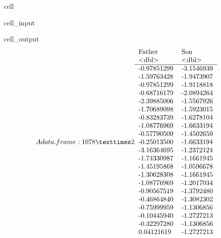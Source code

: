 \documentclass[letterpaper,10pt,english]{jupyterBook}
\begin{document}
\begin{sphinxuseclass}{cell}\begin{sphinxVerbatimInput}

\begin{sphinxuseclass}{cell_input}
\begin{sphinxVerbatim}[commandchars=\\\{\}]
\end{sphinxVerbatim}

\end{sphinxuseclass}\end{sphinxVerbatimInput}
\begin{sphinxVerbatimOutput}

\begin{sphinxuseclass}{cell_output}\begin{equation*}
\begin{split}A data.frame: 1078 × 2
\begin{tabular}{ll}
 Father & Son\\
 <dbl> & <dbl>\\
\hline
	 -0.97851299 & -3.1546939\\
	 -1.59763428 & -1.9473907\\
	 -0.97851299 & -1.9118818\\
	 -0.68716179 & -2.0894264\\
	 -2.39885006 & -1.5567926\\
	 -1.70689098 & -1.5923015\\
	 -0.83283739 & -1.6278104\\
	 -1.08776969 & -1.6633194\\
	 -0.57790509 & -1.4502659\\
	 -0.25013500 & -1.6633194\\
	 -3.16364695 & -1.2372124\\
	 -1.74330987 & -1.1661945\\
	 -1.45195868 & -1.0596678\\
	 -1.30628308 & -1.1661945\\
	 -1.08776969 & -1.2017034\\
	 -0.90567519 & -1.3792480\\
	 -0.46864840 & -1.3082302\\
	 -0.75999959 & -1.1306856\\
	 -0.10445940 & -1.2727213\\
	 -0.32297280 & -1.1306856\\
	  0.04121619 & -1.2727213\\

\end{tabular}
\end{split}
\end{equation*}
\end{sphinxuseclass}
\end{sphinxVerbatimOutput}
\end{sphinxuseclass}
\end{document}
